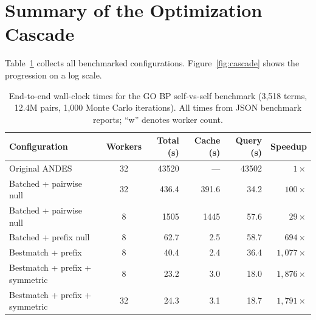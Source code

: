 \documentclass[11pt,a4paper]{article}
\begin{document}
\section{Summary of the Optimization Cascade}

Table~\ref{tab:headline} collects all benchmarked configurations.
Figure~\ref{fig:cascade} shows the progression on a log scale.

\begin{table}[H]
	\centering
	\caption[End-to-end wall-clock times for the GO BP self-vs-self benchmark]{End-to-end wall-clock times for the GO BP self-vs-self benchmark
			(3{,}518 terms, 12.4M pairs, 1{,}000 Monte Carlo iterations).
		All times from JSON benchmark reports; ``w'' denotes worker count.}
	\label{tab:headline}
	\vspace{-0.4em}
	\begin{tabularx}{\textwidth}{@{}Xcrrrr@{}}
		\toprule
		Configuration & Workers & Total (s)   & Cache (s)  & Query (s)   & Speedup         \\
		\midrule
		Original ANDES
		              & 32      & \num{43520} & ---        & \num{43502} & $1\times$       \\
		Batched + pairwise null
		              & 32      & 436.4       & 391.6      & 34.2        & $100\times$     \\
		Batched + pairwise null
		              & 8       & \num{1505}  & \num{1445} & 57.6        & $29\times$      \\
		Batched + prefix null
		              & 8       & 62.7        & 2.5        & 58.7        & $694\times$     \\
		Bestmatch + prefix
		              & 8       & 40.4        & 2.4        & 36.4        & $1{,}077\times$ \\
		Bestmatch + prefix + symmetric
		              & 8       & 23.2        & 3.0        & 18.0        & $1{,}876\times$ \\
		Bestmatch + prefix + symmetric
		              & 32      & 24.3        & 3.1        & 18.7        & $1{,}791\times$ \\
		\bottomrule
	\end{tabularx}
\end{table}
\end{document}
